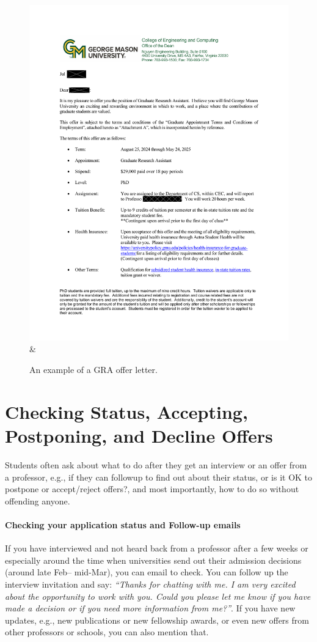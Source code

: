 \documentclass[oneside,11pt,dvipsnames]{book}
\begin{document}
\begin{figure}
    \centering
    \includegraphics[page=1,width=.80\textwidth]{files/gra_offer.pdf} & 
    \caption{An example of a GRA offer letter.}\label{fig:gra-offer}
\end{figure}
%



\section{Checking Status, Accepting, Postponing, and Decline Offers}\label{sec:accept-postpone-decline}

Students often ask about what to do after they get an interview or an offer from a professor, e.g., if they can followup to find out about their status, or is it OK to postpone or accept/reject offers?, and most importantly, how to do so without offending anyone. 

\paragraph{Checking your application status and Follow-up emails} If you have interviewed and not heard back from a professor after a few weeks or especially around the time when universities send out their admission decisions (around late Feb-- mid-Mar), you can email to check.  You can follow up the interview invitation and say: \emph{``Thanks for chatting with me. I am very excited about the opportunity to work with you.  Could you please let me know if you have made a decision or if you need more information from me?''}.  If you have new updates, e.g., new publications or new fellowship awards, or even new offers from other professors or schools, you can also mention that.
\end{document}
